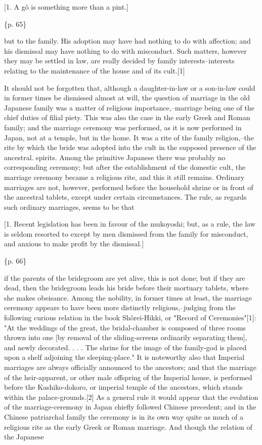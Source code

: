 [1. A gô is something more than a pint.]

\{p. 65\}

but to the family. His adoption may have had nothing to do with affection; and his dismissal may have nothing to do with misconduct. Such matters, however they may be settled in law, are really decided by family interests--interests relating to the maintenance of the house and of its cult.[1]

It should not be forgotten that, although a daughter-in-law or a son-in-law could in former times be dismissed almost at will, the question of marriage in the old Japanese family was a matter of religious importance,--marriage being one of the chief duties of filial piety. This was also the case in the early Greek and Roman family; and the marriage ceremony was performed, as it is now performed in Japan, not at a temple, but in the home. It was a rite of the family religion,--the rite by which the bride was adopted into the cult in the supposed presence of the ancestral. spirits. Among the primitive Japanese there was probably no corresponding ceremony; but after the establishment of the domestic cult, the marriage ceremony became a religious rite, and this it still remains. Ordinary marriages are not, however, performed before the household shrine or in front of the ancestral tablets, except under certain circumstances. The rule, as regards such ordinary marriages, seems to be that

[1. Recent legislation has been in favour of the mukoyoshi; but, as a rule, the law is seldom resorted to except by men dismissed from the family for misconduct, and anxious to make profit by the dismissal.]

\{p. 66\}

if the parents of the bridegroom are yet alive, this is not done; but if they are dead, then the bridegroom leads his bride before their mortuary tablets, where she makes obeisance. Among the nobility, in former times at least, the marriage ceremony appears to have been more distinctly religious,--judging from the following curious relation in the book Shôrei-Hikki, or "Record of Ceremonies"[1]: "At the weddings of the great, the bridal-chamber is composed of three rooms thrown into one [by removal of the sliding-screens ordinarily separating them], and newly decorated. . . . The shrine for the image of the family-god is placed upon a shelf adjoining the sleeping-place." It is noteworthy also that Imperial marriages are always officially announced to the ancestors; and that the marriage of the heir-apparent, or other male offspring of the Imperial house, is performed before the Kashiko-dokoro, or imperial temple of the ancestors, which stands within the palace-grounds.[2] As a general rule it would appear that the evolution of the marriage-ceremony in Japan chiefly followed Chinese precedent; and in the Chinese patriarchal family the ceremony is in its own way quite as much of a religious rite as the early Greek or Roman marriage. And though the relation of the Japanese


